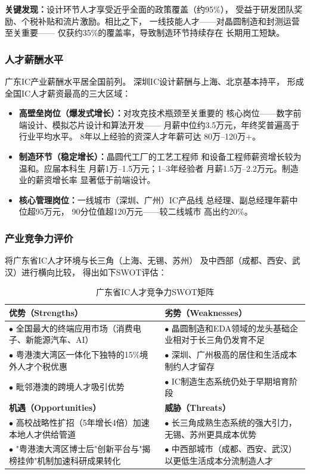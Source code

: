 \documentclass[12pt,a4paper]{article}
\newcommand{\tableHeaderRow}{\rowcolor{tealPrimary}\color{white}}
\newcommand{\tableOddRow}{\rowcolor{mintBG}}
\begin{document}
\textbf{关键发现：}设计环节人才享受近乎全面的政策覆盖（约95\%），
受益于研发团队奖励、个税补贴和流片激励。相比之下，
一线技能人才——对晶圆制造和封测运营至关重要——
仅获约35\%的覆盖率，导致制造环节持续存在
长期用工短缺。

\subsubsection{人才薪酬水平}

广东IC产业薪酬水平居全国前列。
深圳IC设计薪酬与上海、北京基本持平，
形成全国IC人才薪资最高的三大区域：

\begin{itemize}
    \item \textbf{高壁垒岗位（爆发式增长）：}对攻克技术瓶颈至关重要的
          核心岗位——数字前端设计、模拟芯片设计和算法开发——
          月薪中位约3.5万元，年终奖普遍高于行业平均水平。
          8年以上经验的资深人才年薪可达
          80万--120万+。
    \item \textbf{制造环节（稳定增长）：}晶圆代工厂的工艺工程师
          和设备工程师薪资增长较为温和。应届本科生
          月薪1万--1.5万元；1--3年经验者
          月薪1.5万--2.2万元。制造业的薪资增长率
          显著低于前端设计。
    \item \textbf{核心管理岗位：}一线城市（深圳、广州）IC产品线
          总经理、副总经理年薪中位超95万元，
          90分位值超120万元——较二线城市
          高出约20\%。
\end{itemize}

\subsubsection{产业竞争力评价}

将广东省IC人才环境与长三角（上海、无锡、苏州）
及中西部（成都、西安、武汉）进行横向比较，
得出如下SWOT评估：

\begin{table}[H]
\centering
\caption{广东省IC人才竞争力SWOT矩阵}
\label{tab:talent_swot}
\begin{tabular}{p{7cm}p{7cm}}
\toprule
\tableHeaderRow
\textbf{优势（Strengths）} & \textbf{劣势（Weaknesses）} \\
\midrule
\tableOddRow
$\bullet$ 全国最大的终端应用市场（消费电子、新能源汽车、AI） &
$\bullet$ 晶圆制造和EDA领域的龙头基础企业相对于长三角仍发育不足 \\
$\bullet$ 粤港澳大湾区一体化下独特的15\%境外人才个税优惠 &
$\bullet$ 深圳、广州极高的居住和生活成本制约人才留存 \\
$\bullet$ 毗邻港澳的跨境人才吸引优势 &
$\bullet$ IC制造生态系统仍处于早期培育阶段 \\
\midrule
\tableHeaderRow
\textbf{机遇（Opportunities）} & \textbf{威胁（Threats）} \\
\midrule
\tableOddRow
$\bullet$ 高校战略性扩招（5年增长4倍）加速本地人才供给管道 &
$\bullet$ 长三角成熟生态系统的强大引力，无锡、苏州更具成本优势 \\
$\bullet$ "粤港澳大湾区博士后"创新平台与"揭榜挂帅"机制加速科研成果转化 &
$\bullet$ 中西部城市（成都、西安、武汉）以更低生活成本分流制造人才 \\
\bottomrule
\end{tabular}
\end{table}
\end{document}
